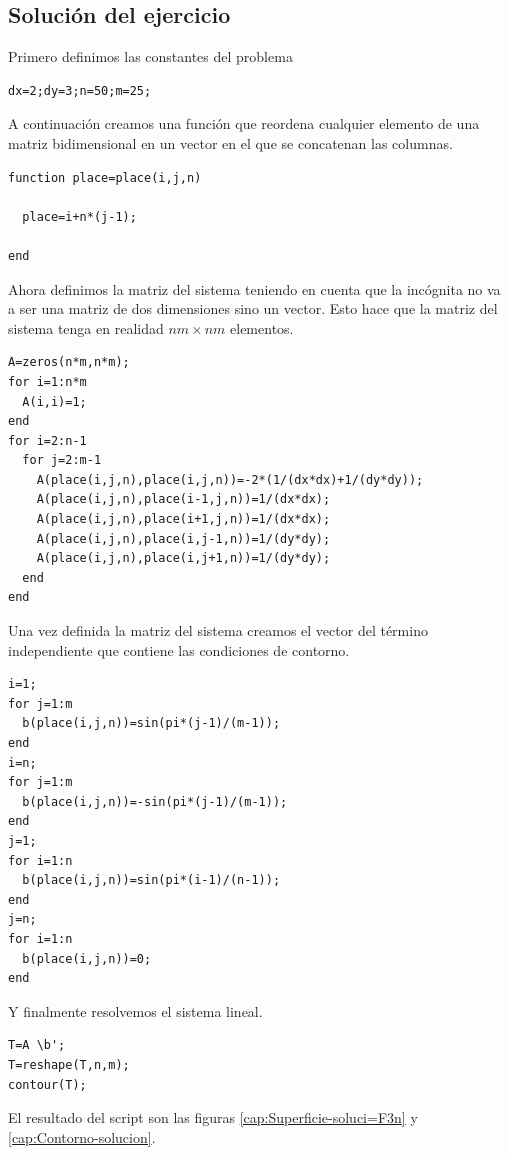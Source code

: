 \subsection{Solución del ejercicio}

Primero definimos las constantes del problema

  \begin{verbatim}
dx=2;dy=3;n=50;m=25;
\end{verbatim}
A continuación creamos una función que reordena cualquier elemento de
una matriz bidimensional en un vector en el que se concatenan las
columnas.

  \begin{verbatim}
function place=place(i,j,n)

  place=i+n*(j-1);

end
\end{verbatim}
Ahora definimos la matriz del sistema teniendo en cuenta que la
incógnita no va a ser una matriz de dos dimensiones sino un vector.
Esto hace que la matriz del sistema tenga en realidad $nm\times nm$
elementos.

  \begin{verbatim}
A=zeros(n*m,n*m);
for i=1:n*m
  A(i,i)=1;
end
for i=2:n-1
  for j=2:m-1
    A(place(i,j,n),place(i,j,n))=-2*(1/(dx*dx)+1/(dy*dy));
    A(place(i,j,n),place(i-1,j,n))=1/(dx*dx);
    A(place(i,j,n),place(i+1,j,n))=1/(dx*dx);
    A(place(i,j,n),place(i,j-1,n))=1/(dy*dy);
    A(place(i,j,n),place(i,j+1,n))=1/(dy*dy);
  end
end
\end{verbatim}
Una vez definida la matriz del sistema creamos el vector del término
independiente que contiene las condiciones de contorno.

\begin{verbatim}
i=1;
for j=1:m
  b(place(i,j,n))=sin(pi*(j-1)/(m-1));
end
i=n;
for j=1:m
  b(place(i,j,n))=-sin(pi*(j-1)/(m-1));
end
j=1;
for i=1:n
  b(place(i,j,n))=sin(pi*(i-1)/(n-1));
end
j=n;
for i=1:n
  b(place(i,j,n))=0;
end
\end{verbatim}
Y finalmente resolvemos el sistema lineal.

\begin{verbatim}
T=A \b';
T=reshape(T,n,m);
contour(T);
\end{verbatim}
El resultado del script son las figuras
\ref{cap:Superficie-soluci=F3n} y \ref{cap:Contorno-solucion}.

